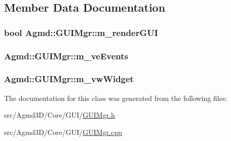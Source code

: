 \subsection{Member Data Documentation}
\hypertarget{class_agmd_1_1_g_u_i_mgr_a28d33ffc1d54a264c73df61abb69b1d8}{
\subsubsection[{m\+\_\+render\+G\+U\+I}]{\setlength{\rightskip}{0pt plus 5cm}bool Agmd\+::\+G\+U\+I\+Mgr\+::m\+\_\+render\+G\+U\+I\hspace{0.3cm}{\ttfamily [protected]}}}\label{class_agmd_1_1_g_u_i_mgr_a28d33ffc1d54a264c73df61abb69b1d8}
\hypertarget{class_agmd_1_1_g_u_i_mgr_ae16fcf7d7182b769a9776f448c5d6e75}{
\subsubsection[{m\+\_\+ve\+Events}]{ Agmd\+::\+G\+U\+I\+Mgr\+::m\+\_\+ve\+Events\hspace{0.3cm}{\ttfamily [protected]}}}\label{class_agmd_1_1_g_u_i_mgr_ae16fcf7d7182b769a9776f448c5d6e75}
\hypertarget{class_agmd_1_1_g_u_i_mgr_ae1298a740c306f7e9dd69f36a2624b89}{
\subsubsection[{m\+\_\+vw\+Widget}]{ Agmd\+::\+G\+U\+I\+Mgr\+::m\+\_\+vw\+Widget\hspace{0.3cm}{\ttfamily [protected]}}}\label{class_agmd_1_1_g_u_i_mgr_ae1298a740c306f7e9dd69f36a2624b89}


The documentation for this class was generated from the following files\+:\begin{DoxyCompactItemize}
\item 
src/\+Agmd3\+D/\+Core/\+G\+U\+I/\hyperlink{_g_u_i_mgr_8h}{G\+U\+I\+Mgr.\+h}\item 
src/\+Agmd3\+D/\+Core/\+G\+U\+I/\hyperlink{_g_u_i_mgr_8cpp}{G\+U\+I\+Mgr.\+cpp}\end{DoxyCompactItemize}
